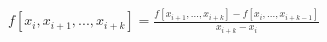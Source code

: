 \documentclass[preview]{standalone}
\begin{document}
\begin{align*}
f[x_i, x_{i+1}, ..., x_{i+k}] =  \frac{f[x_{i+1}, ..., x_{i+k}] - f[x_i, ..., x_{i+k-1}]}{x_{i+k} - x_i}
\end{align*}
\end{document}
